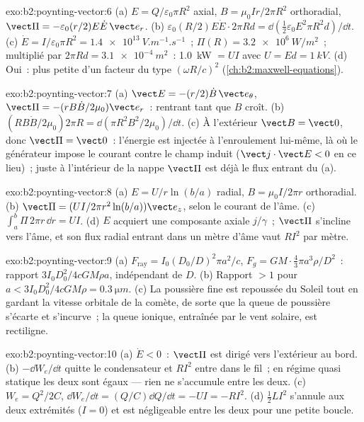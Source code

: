 \begin{solution}{exo:b2:poynting-vector:6}
(a) $E = Q/\varepsilon_0\pi R^2$ axial, $B = \mu_0Ir/2\pi R^2$ orthoradial, $\vect\Pi = -\varepsilon_0
(r/2)E\dot E\,\vect e_r$. (b) $\varepsilon_0(R/2)E\dot E\cdot2\pi Rd = \dd(\tfrac12\varepsilon_0E^2\pi R^2d)/
\dd t$. (c) $\dot E = I/\varepsilon_0\pi R^2 = \qty{1.4e13}{V.m^{-1}.s^{-1}}$~; $\Pi(R) = \qty{3.2e6}{W/m^2}$~;
multiplié par $2\pi Rd = \qty{3.1e-4}{m^2}$~: \qty{1.0}{kW} $= UI$ avec $U = Ed = \qty{1}{kV}$. (d)
Oui~: plus petite d'un facteur du type $(\omega R/c)^2$ (\cref{ch:b2:maxwell-equations}).
\end{solution}

\begin{solution}{exo:b2:poynting-vector:7}
(a) $\vect E = -(r/2)\dot B\,\vect e_\theta$, $\vect\Pi = -(rB\dot B/2\mu_0)\vect e_r$~: rentrant
tant que $B$ croît. (b) $(RB\dot B/2\mu_0)2\pi R = \dd(\pi R^2B^2/2\mu_0)/\dd t$. (c)
À l'extérieur $\vect B = \vect 0$, donc $\vect\Pi = \vect 0$~: l'énergie est injectée à
l'enroulement lui-même, là où le générateur impose le courant contre le champ
induit ($\vect j\cdot\vect E < 0$ en ce lieu)~; juste à l'intérieur de la nappe
$\vect\Pi$ est déjà le flux entrant du (a).
\end{solution}

\begin{solution}{exo:b2:poynting-vector:8}
(a) $E = U/r\ln(b/a)$ radial, $B = \mu_0I/2\pi r$ orthoradial. (b) $\vect\Pi = (UI/
2\pi r^2\ln(b/a))\vect e_z$, selon le courant de l'âme. (c) $\int_a^b\Pi\,2\pi r\,\dd r =
UI$. (d) $E$ acquiert une composante axiale $j/\gamma$~; $\vect\Pi$ s'incline vers
l'âme, et son flux radial entrant dans un mètre d'âme vaut $RI^2$ par mètre.
\end{solution}

\begin{solution}{exo:b2:poynting-vector:9}
(a) $F_{\text{ray}} = I_0(D_0/D)^2\pi a^2/c$, $F_g = GM\cdot\tfrac43\pi a^3\rho/D^2$~: rapport
$3I_0D_0^2/4cGM\rho a$, indépendant de $D$. (b) Rapport $> 1$ pour $a < 3I_0D_0^2/
4cGM\rho = \qty{0.3}{\micro m}$. (c) La poussière fine est repoussée du Soleil tout en
gardant la vitesse orbitale de la comète, de sorte que la queue de poussière s'écarte et
s'incurve~; la queue ionique, entraînée par le vent solaire, est rectiligne.
\end{solution}

\begin{solution}{exo:b2:poynting-vector:10}
(a) $\dot E < 0$~: $\vect\Pi$ est dirigé vers l'extérieur au bord. (b) $-\dd W_e/\dd t$
quitte le condensateur et $RI^2$ entre dans le fil~; en régime quasi statique
les deux sont égaux --- rien ne s'accumule entre les deux. (c) $W_e =
Q^2/2C$, $\dd W_e/\dd t = (Q/C)\dd Q/\dd t = -UI = -RI^2$. (d) $\tfrac12LI^2$
s'annule aux deux extrémités ($I = 0$) et est négligeable entre les deux pour une petite
boucle.
\end{solution}

